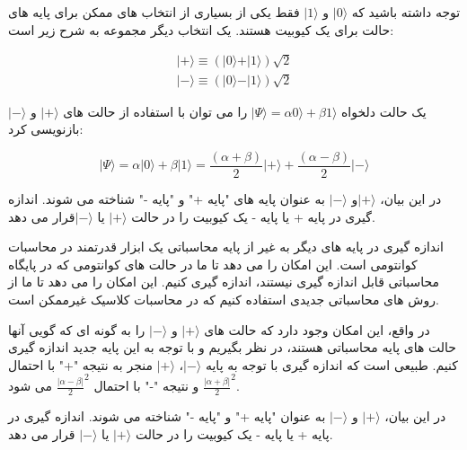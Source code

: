 \documentclass{book}
\begin{document}
توجه داشته باشید که $\vert 0 \rangle$ و $\vert 1 \rangle$ فقط یکی از بسیاری از انتخاب های ممکن برای پایه های حالت برای یک کیوبیت هستند. یک انتخاب دیگر مجموعه به شرح زیر است:

\begin{center}
\begin{equation}\label{ket +-} 
	\begin{split}
	\vert+\rangle  \equiv (\vert0\rangle + \vert1\rangle)\sqrt{2}\\
	\vert-\rangle \equiv  (\vert0\rangle - \vert1\rangle)\sqrt{2}
\end{split}
\end{equation}
\end{center}
 
 
 یک حالت دلخواه $\vert\Psi\rangle = \alpha0\rangle + \beta1\rangle$ را می توان با استفاده از حالت های $\vert + \rangle$ و $\vert - \rangle$ بازنویسی کرد:
\begin{center}
	\begin{equation}\label{basis to forier}
		\vert\Psi\rangle = \alpha \vert0\rangle + \beta\vert1\rangle = \frac{(\alpha + \beta)}{2}\vert+\rangle + \frac{(\alpha - \beta)}{2}\vert-\rangle
	\end{equation}
\end{center}


در این بیان، $\vert+\rangle$و $\vert-\rangle$ به عنوان پایه های "پایه +" و "پایه -" شناخته می شوند. اندازه گیری در پایه + یا پایه - یک کیوبیت را در حالت $\vert+\rangle$ یا $\vert-\rangle$قرار می دهد.
 

اندازه گیری در پایه های دیگر به غیر از پایه محاسباتی یک ابزار قدرتمند در محاسبات کوانتومی است. این امکان را می دهد تا ما در حالت های کوانتومی که در پایگاه محاسباتی قابل اندازه گیری نیستند، اندازه گیری کنیم. این امکان را می دهد تا ما از روش های محاسباتی جدیدی استفاده کنیم که در محاسبات کلاسیک غیرممکن است.

در واقع، این امکان وجود دارد که حالت های $\vert+\rangle$ و $\vert-\rangle$ را به گونه ای که گویی آنها حالت های پایه محاسباتی هستند، در نظر بگیریم و با توجه به این پایه جدید اندازه گیری کنیم. طبیعی است که اندازه گیری با توجه به پایه $\vert-\rangle$، $\vert+\rangle$ منجر به نتیجه "+" با احتمال $\frac{\vert\alpha + \beta\vert}{2}^2$ و نتیجه "-" با احتمال $\frac{\vert\alpha - \beta\vert}{2}^2$ می شود.


در این بیان، $\vert+\rangle$ و $\vert-\rangle$ به عنوان "پایه +" و "پایه -" شناخته می شوند. اندازه گیری در پایه + یا پایه - یک کیوبیت را در حالت $\vert+\rangle$ یا $\vert-\rangle$ قرار می دهد.
\end{document}
